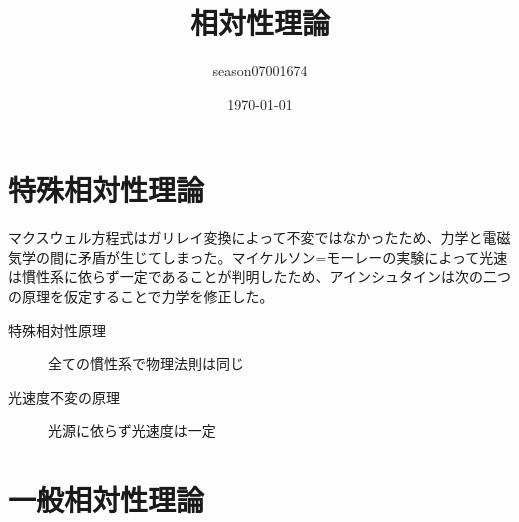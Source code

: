 \documentclass{jsarticle}
\title{相対性理論}
\author{season07001674}
\date{\today}
\renewcommand{\(}{\left(}
\renewcommand{\)}{\right)}
\theoremstyle{definition}
\begin{document}
\maketitle
\tableofcontents

\part{特殊相対性理論}
マクスウェル方程式はガリレイ変換によって不変ではなかったため、力学と電磁気学の間に矛盾が生じてしまった。マイケルソン=モーレーの実験によって光速は慣性系に依らず一定であることが判明したため、アインシュタインは次の二つの原理を仮定することで力学を修正した。
\begin{description}
    \item[特殊相対性原理] 全ての慣性系で物理法則は同じ
    \item[光速度不変の原理] 光源に依らず光速度は一定
\end{description}





\part{一般相対性理論}






\end{document}
